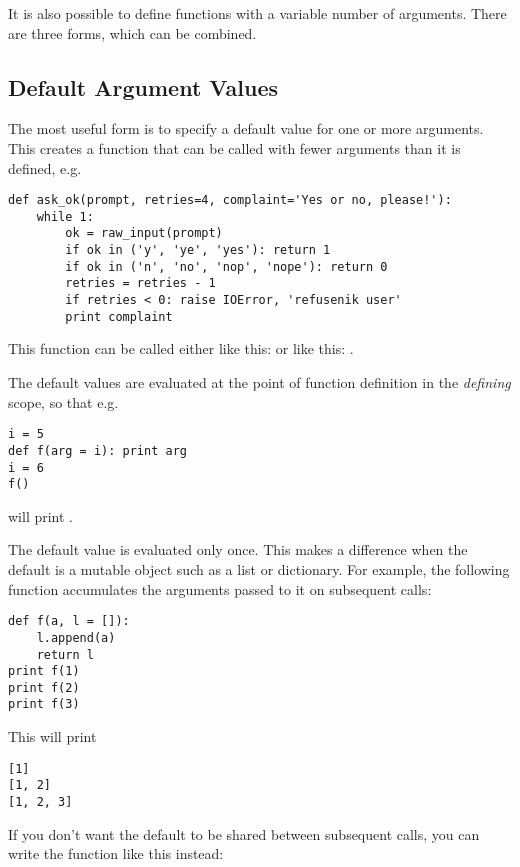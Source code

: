 \documentclass{manual}
\begin{document}
It is also possible to define functions with a variable number of
arguments.  There are three forms, which can be combined.

\subsection{Default Argument Values \label{defaultArgs}}

The most useful form is to specify a default value for one or more
arguments.  This creates a function that can be called with fewer
arguments than it is defined, e.g.

\begin{verbatim}
def ask_ok(prompt, retries=4, complaint='Yes or no, please!'):
    while 1:
        ok = raw_input(prompt)
        if ok in ('y', 'ye', 'yes'): return 1
        if ok in ('n', 'no', 'nop', 'nope'): return 0
        retries = retries - 1
        if retries < 0: raise IOError, 'refusenik user'
        print complaint
\end{verbatim}

This function can be called either like this:
 or like this:
.

The default values are evaluated at the point of function definition
in the \emph{defining} scope, so that e.g.

\begin{verbatim}
i = 5
def f(arg = i): print arg
i = 6
f()
\end{verbatim}

will print .

  The default value is evaluated only once.
This makes a difference when the default is a mutable object such as a
list or dictionary.  For example, the following function accumulates
the arguments passed to it on subsequent calls:

\begin{verbatim}
def f(a, l = []):
    l.append(a)
    return l
print f(1)
print f(2)
print f(3)
\end{verbatim}

This will print

\begin{verbatim}
[1]
[1, 2]
[1, 2, 3]
\end{verbatim}

If you don't want the default to be shared between subsequent calls,
you can write the function like this instead:
\end{document}
